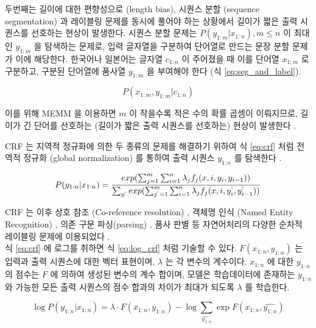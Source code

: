 \documentclass[oneside, ko,phd]{snuthesis_utf8_kor}
\begin{document}
두번째는 길이에 대한 편향성으로 (length bias), 시퀀스 분할 (sequence segmentation) 과 레이블링 문제를 동시에 풀어야 하는 상황에서 길이가 짧은 출력 시퀀스를 선호하는 현상이 발생한다.
시퀀스 분할 문제는 $P(y_{1:m} \vert x_{1:n}), m \le n$ 이 최대인 $y_{1:m}$ 을 탐색하는 문제로, 입력 글자열을 구분하여 단어열로 만드는 문장 분할 문제가 이에 해당한다.
한국어나 일본어는 글자열 $c_{1:n}$ 이 주어졌을 때 이를 단어열 $x_{1:m}$ 로 구분하고, 구분된 단어열에 품사열 $y_{1:m}$ 을 부여해야 한다 (식 \ref{eq:seg_and_label}).

\begin{equation}
  \label{eq:seg_and_label}
  P(x_{1:m}, y_{1:m} \vert c_{1:n})
\end{equation}

이를 위해 MEMM 을 이용하면 $m$ 이 작을수록 적은 수의 확률 곱셈이 이뤄지므로, 길이가 긴 단어를 선호하는 (길이가 짧은 출력 시퀀스를 선호하는) 현상이 발생한다 \cite{kudo2004applying}.

CRF 는 지역적 정규화에 의한 두 종류의 문제를 해결하기 위하여 식 \ref{eq:crf} 처럼 전역적 정규화 (global normalization) 를 통하여 출력 시퀀스 $y_{1:n}$ 를 탐색한다 \cite{lafferty2001conditional}.

\begin{equation}
  \label{eq:crf}
  P(y_{1:n} \vert x_{1:n}) = \frac{exp(\sum_{j=1}^{m} \sum_{i=1}^{n} \lambda_j f_j (x, i, y_i, y_{i-1}))}{ \sum_{y^{`}} exp(\sum_{j^{`}=1}^{m} \sum_{i=1}^{n} \lambda_j f_j (x, i, y_i^{`}, y_{i-1}^{`})) }
\end{equation}

CRF 는 이후 상호 참조 (Co-reference resolution) \cite{mccallum2005conditional}, 객체명 인식 (Named Entity Recognition)  \cite{ritter2011named, minkov2005extracting, ling2012fine, sang2003introduction, sarawagi2005semi}, 의존 구문 파싱(parsing) \cite{sha2003shallow, finkel2008efficient}, 품사 판별 \cite{toutanova2003feature, gimpel2010part} 등 자연어처리의 다양한 순차적 레이블링 문제에 이용되었다 \cite{choi2005identifying, mccallum2003early}. \\

식 \ref{eq:crf} 에 로그를 취하면 식 \ref{eq:log_crf} 처럼 기술할 수 있다.
$F(x_{1:n},y_{1:n})$ 는 입력과 출력 시퀀스에 대한 벡터 표현이며, $\lambda$ 는 각 변수의 계수이다.
$x_{1:n}$ 에 대한 $y_{1:n}$ 의 점수는 $F$ 에 의하여 생성된 변수의 계수 합이며, 모델은 학습데이터에 존재하는 $y_{1:n}$ 와 가능한 모든 출력 시퀀스의 점수 합과의 차이가 최대가 되도록 $\lambda$ 를 학습한다.

\begin{equation}
  \label{eq:log_crf}
  \log P(y_{1:n} \vert x_{1:n}) = \lambda \cdot F(x_{1:n}, y_{1:n}) - \log \sum_{\hat{y_{1:n}}} \exp F(x_{1:n}, \hat{y_{1:n}})
\end{equation}
\end{document}
